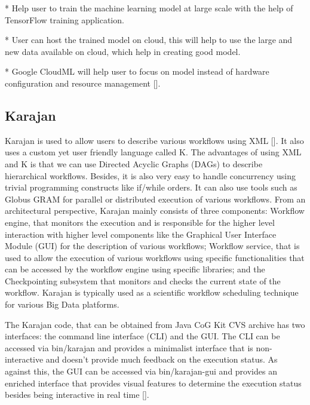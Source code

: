 * Help user to train the machine learning model at large scale
  with the help of TensorFlow  training application.
  
* User can host the trained model on cloud,  this will help
  to use the large and new data available on cloud, which help in
  creating good model.

* Google CloudML will help user to focus on model instead of
  hardware configuration and resource
  management [\cite{www-googlecloudoverview}].

\subsection{Karajan}

Karajan is used to allow users to describe various workflows using
XML [\cite{RMBDP-Book-1}].  It also uses a custom yet user friendly
language called K.  The advantages of using XML and K is that we can
use Directed Acyclic Graphs (DAGs) to describe hierarchical workflows.
Besides, it is also very easy to handle concurrency using trivial
programming constructs like if/while orders.  It can also use tools
such as Globus GRAM for parallel or distributed execution of various
workflows.  From an architectural perspective, Karajan mainly consists
of three components: Workflow engine, that monitors the execution and
is responsible for the higher level interaction with higher level
components like the Graphical User Interface Module (GUI) for the
description of various workflows; Workflow service, that is used to
allow the execution of various workflows using specific
functionalities that can be accessed by the workflow engine using
specific libraries; and the Checkpointing subsystem that monitors and
checks the current state of the workflow.  Karajan is typically used
as a scientific workflow scheduling technique for various Big Data
platforms.

The Karajan code, that can be obtained from Java CoG Kit CVS archive
has two interfaces: the command line interface (CLI) and the GUI.  The
CLI can be accessed via bin/karajan and provides a minimalist
interface that is non-interactive and doesn't provide much feedback on
the execution status.  As against this, the GUI can be accessed via
bin/karajan-gui and provides an enriched interface that provides
visual features to determine the execution status besides being
interactive in real time [\cite{Karajan-interfaces}].


